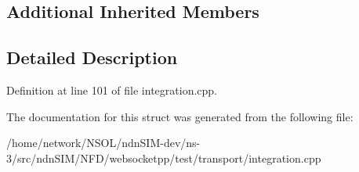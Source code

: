 \subsection*{Additional Inherited Members}


\subsection{Detailed Description}


Definition at line 101 of file integration.\+cpp.



The documentation for this struct was generated from the following file\+:\begin{DoxyCompactItemize}
\item 
/home/network/\+N\+S\+O\+L/ndn\+S\+I\+M-\/dev/ns-\/3/src/ndn\+S\+I\+M/\+N\+F\+D/websocketpp/test/transport/integration.\+cpp\end{DoxyCompactItemize}
